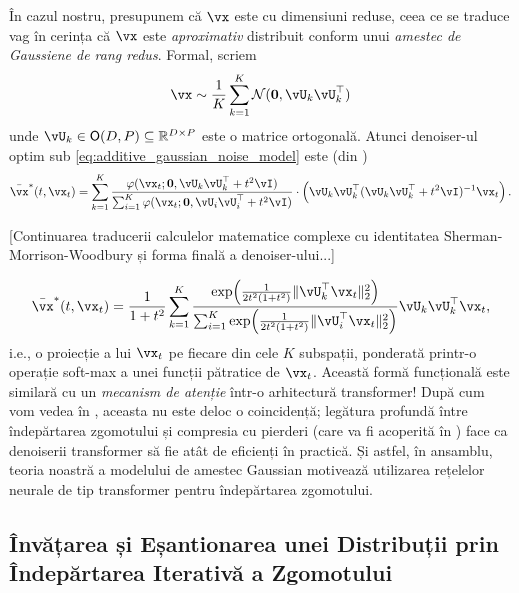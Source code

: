 \documentclass[../../book-main_ro.tex]{subfiles}
\begin{document}
În cazul nostru, presupunem că \(\vx\) este cu dimensiuni reduse, ceea ce se traduce vag în cerința că \(\vx\) este \textit{aproximativ} distribuit conform unui \textit{amestec de Gaussiene de rang redus}. Formal, scriem
\begin{equation}\label{eq:MoG1}
	\vx \sim \frac{1}{K}\sum_{k = 1}^{K}\dNorm(\vzero, \vU_{k}\vU_{k}^{\top})
\end{equation}
unde \(\vU_{k} \in \O(D, P) \subseteq \R^{D \times P}\) este o matrice ortogonală. Atunci denoiser-ul optim sub \eqref{eq:additive_gaussian_noise_model} este (din )
\begin{equation}
	\bar{\vx}^{\ast}(t, \vx_{t}) = \sum_{k = 1}^{K}\frac{\phi(\vx_{t} ; \vzero,
	\vU_{k}\vU_{k}^{\top} + t^{2}\vI)}{\sum_{i = 1}^{K}\phi(\vx_{t} ; \vzero, \vU_{i}\vU_{i}^{\top} + t^{2}\vI)}\cdot\bp{\vU_{k}\vU_{k}^{\top}(\vU_{k}\vU_{k}^{\top} + t^{2}\vI)^{-1}\vx_{t}}.
\end{equation}

[Continuarea traducerii calculelor matematice complexe cu identitatea Sherman-Morrison-Woodbury și forma finală a denoiser-ului...]

\begin{equation}\label{eq:gmm_lowrank_denoiser}
	\bar{\vx}^{\ast}(t, \vx_{t}) = \frac{1}{1 + t^{2}}\sum_{k = 1}^{K}\frac{\exp\rp{\frac{1}{2t^{2}(1 + t^{2})}\norm{\vU_{k}^{\top}\vx_{t}}_{2}^{2}}}{\sum_{i = 1}^{K}\exp\rp{\frac{1}{2t^{2}(1 + t^{2})}\norm{\vU_{i}^{\top}\vx_{t}}_{2}^{2}}}\vU_{k}\vU_{k}^{\top}\vx_{t},
\end{equation}
i.e., o proiecție a lui \(\vx_{t}\) pe fiecare din cele \(K\) subspații, ponderată printr-o operație soft-max a unei funcții pătratice de \(\vx_{t}\). Această formă funcțională este similară cu un \textit{mecanism de atenție} într-o arhitectură transformer! După cum vom vedea în , aceasta nu este deloc o coincidență; legătura profundă între îndepărtarea zgomotului și compresia cu pierderi (care va fi acoperită în ) face ca denoiserii transformer să fie atât de eficienți în practică. Și astfel, în ansamblu, teoria noastră a modelului de amestec Gaussian motivează utilizarea rețelelor neurale de tip transformer pentru îndepărtarea zgomotului.

\subsection{Învățarea și Eșantionarea unei Distribuții prin Îndepărtarea Iterativă a Zgomotului}\label{sub:sampling_denoising}
\end{document}
